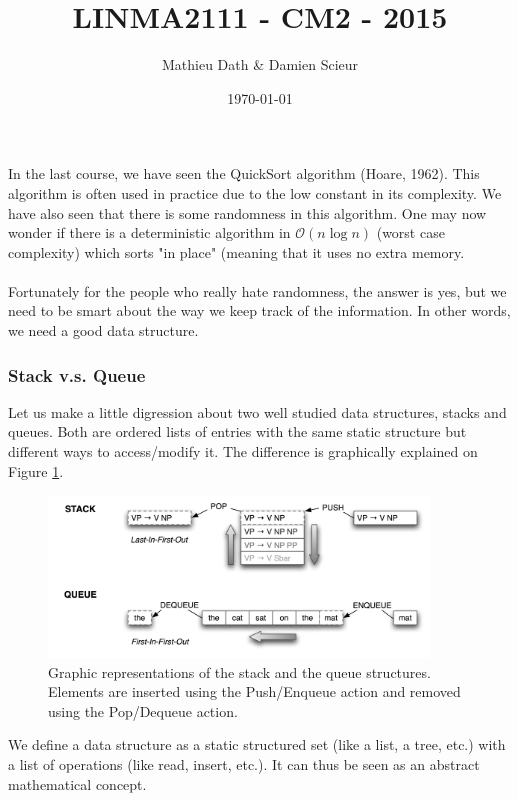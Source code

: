 \documentclass[11pt,a4paper]{article}
\begin{document}
\title{LINMA2111 - CM2 - 2015}
\author{Mathieu Dath \& Damien Scieur}
\date{\today}
\maketitle

In the last course, we have seen the QuickSort algorithm (Hoare, 1962). This algorithm is often used in practice due to the low constant in its complexity. We have also seen that there is some randomness in this algorithm. One may now wonder if there is a deterministic algorithm in $\mathcal{O}(n\log n)$ (worst case complexity) which sorts "in place" (meaning that it uses no extra memory. 
\\ \\
Fortunately for the people who really hate randomness, the answer is yes, but we need to be smart about the way we keep track of the information. In other words, we need a good data structure.

\subsubsection*{Stack v.s. Queue}


Let us make a little digression about two well studied data structures, stacks and queues. Both are ordered lists of entries with the same static structure but different ways to access/modify it. The difference is graphically explained on Figure \ref{stackandqueue}.

\begin{figure}[!h]
	\centering
 	\includegraphics[width=0.9\textwidth]{stack-queue.png}
  	\caption{Graphic representations of the stack and the queue structures. Elements are inserted using the Push/Enqueue action and removed using the Pop/Dequeue action.}
   	\label{stackandqueue}
\end{figure}

We define a data structure as a static structured set (like a list, a tree, etc.) with a list of operations (like read, insert, etc.). It can thus be seen as an abstract mathematical concept. 
\end{document}
